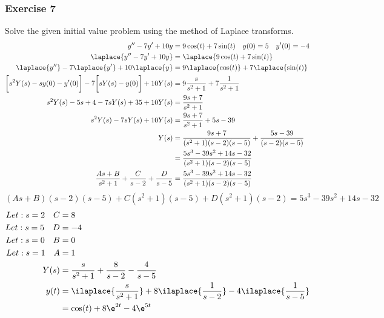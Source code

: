 \documentclass{math}
\begin{document}
\subsubsection*{Exercise 7}
Solve the given initial value problem using the method of Laplace transforms.
\begin{align*}
  y''-7y'+10y &= 9\cos(t)+7\sin(t) \quad y(0) = 5 \quad y'(0) = -4 \\
  \laplace{y''-7y'+10y} &= \laplace{9\cos(t)+7\sin(t)} \\
  \laplace{y''}-7\laplace{y'}+10\laplace{y} &=
    9\laplace{\cos(t)}+7\laplace{\sin(t)} \\
  \bigg[s^2Y(s)-sy(0)-y'(0)\bigg]-7\bigg[sY(s)-y(0)\bigg]+10Y(s) &=
    9\frac{s}{s^2+1}+7\frac{1}{s^2+1} \\
  s^2Y(s)-5s+4-7sY(s)+35+10Y(s) &= \frac{9s+7}{s^2+1} \\
  s^2Y(s)-7sY(s)+10Y(s) &= \frac{9s+7}{s^2+1}+5s-39 \\
  Y(s) &= \frac{9s+7}{(s^2+1)(s-2)(s-5)}+\frac{5s-39}{(s-2)(s-5)} \\
  &= \frac{5s^3-39s^2+14s-32}{(s^2+1)(s-2)(s-5)} \\
  \frac{As+B}{s^2+1}+\frac{C}{s-2}+\frac{D}{s-5} &=
    \frac{5s^3-39s^2+14s-32}{(s^2+1)(s-2)(s-5)}
\end{align*}
\[ (As+B)(s-2)(s-5)+C(s^2+1)(s-5)+D(s^2+1)(s-2) = 5s^3-39s^2+14s-32 \]
\begin{align*}
  Let: s = 2 \quad C &= 8 \\
  Let: s = 5 \quad D &= -4 \\
  Let: s = 0 \quad B &= 0 \\
  Let: s = 1 \quad A &= 1 \\
  Y(s) &= \frac{s}{s^2+1}+\frac{8}{s-2}-\frac{4}{s-5} \\
  y(t) &= \ilaplace{\frac{s}{s^2+1}}+8\ilaplace{\frac{1}{s-2}}-
    4\ilaplace{\frac{1}{s-5}} \\
  &= \cos(t)+8\e^{2t}-4\e^{5t}
\end{align*}
\end{document}
